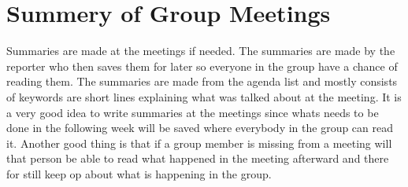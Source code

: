\section{Summery of Group Meetings}
Summaries are made at the meetings if needed. The summaries are made by the reporter who then saves them for later so everyone in the group have a chance of reading them. 
The summaries are made from the agenda list and mostly consists of keywords are short lines explaining what was talked about at the meeting.
It is a very good idea to write summaries at the meetings since whats needs to be done in the following week will be saved where everybody in the group can read it. 
Another good thing is that if a group member is missing from a meeting will that person be able to read what happened in the meeting afterward and there for still keep op about what is happening in the group.